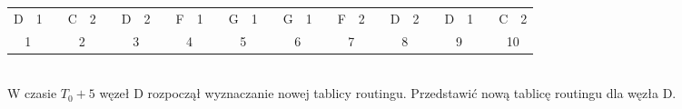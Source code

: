 \documentclass[a4paper,twoside]{article}
\begin{document}
\begin{tabular}{|c|c|c|c|c|c|c|c|c|c|c|c|c|c|c|c|c|c|c|c|c|c|c|c|c|c|c|c|c|}
	D          & 1          &  & C           & 2         &  & D          & 2         &  & F           & 1         &  & G           & 1         &  & G           & 1         &  & F           & 2         &  & D           & 2         &  & D           & 1         &  & C          & 2         \\ \cline{1-2} \cline{4-5} \cline{7-8} \cline{10-11} \cline{13-14} \cline{16-17} \cline{19-20} \cline{22-23} \cline{25-26} \cline{28-29}
	\multicolumn{2}{c}{1} &  & \multicolumn{2}{c}{2} &  & \multicolumn{2}{c}{3} &  & \multicolumn{2}{c}{4} &  & \multicolumn{2}{c}{5} &  & \multicolumn{2}{c}{6} &  & \multicolumn{2}{c}{7} &  & \multicolumn{2}{c}{8} &  & \multicolumn{2}{c}{9} &  & \multicolumn{2}{c}{10} \\ 
\end{tabular}\\
W czasie $ T_0+5 $ węzeł D rozpoczął wyznaczanie nowej tablicy routingu. Przedstawić nową tablicę routingu dla węzła D.
\newpage
\end{document}
